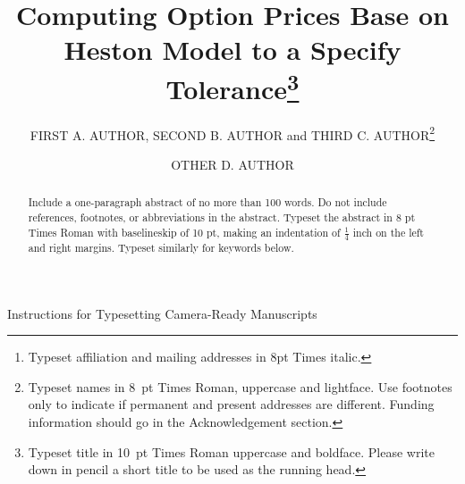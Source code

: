 \documentclass{ws-ijfe}
\begin{document}
{Instructions for Typesetting Camera-Ready Manuscripts}

\catchline{}{}{}{}{}

\title{Computing Option Prices Base on Heston Model to a Specify Tolerance\footnote{Typeset title in
10~pt Times Roman uppercase and boldface. Please write
down in pencil a short title to be used as the running head.}}

\author{FIRST A. AUTHOR, SECOND B. AUTHOR and THIRD
C. AUTHOR\footnote{Typeset names in 8~pt Times Roman, uppercase
and lightface.  Use footnotes only to indicate if permanent and
present addresses are different. Funding information should go
in the Acknowledgement section.}}

\address{Full affiliations\footnote{Typeset
affiliation and mailing addresses in 8pt Times italic.} \\
,mailing addresses and telephone number}

\author{OTHER D. AUTHOR}

\address{Full affiliations \\
,mailing addresses and telephone number}

\maketitle

\begin{abstract}
Include a one-paragraph abstract of no more than 100 words. Do not include references, footnotes, or abbreviations in the abstract. Typeset the
abstract in 8 pt Times Roman with baselineskip of 10 pt, making
an indentation of $\frac14$ inch on the left and right margins.
Typeset similarly for keywords below.
\end{abstract}

\end{document}
